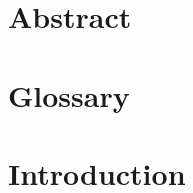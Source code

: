 \documentclass[a4paper,11, oneside]{article}
\begin{document}
%


%


\pagebreak

%


%

\section*{Abstract}


\pagebreak

\section*{Glossary}


\pagebreak

\tableofcontents
\pagebreak
\listoffigures
\listoftables
\pagebreak
\newpage


\cleardoublepage{}

\section{Introduction}

\pagebreak
\end{document}

